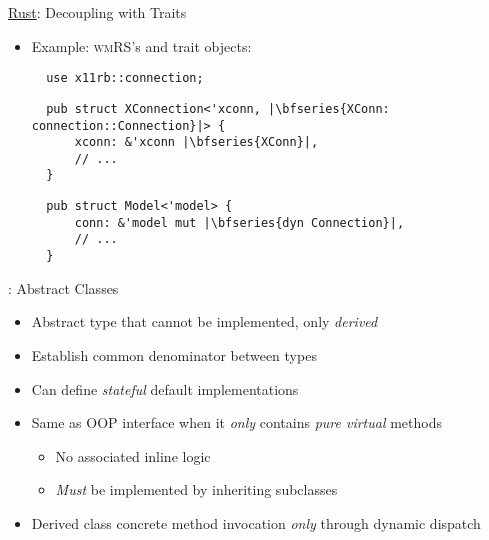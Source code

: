 \begin{frame}[fragile]{\underline{Rust}: Decoupling with Traits \hfill {\footnotesize \currentname}}


    \begin{itemize}

        \item Example: \textsc{wmRS}'s  and  trait objects:\\[3pt]
\begin{verbatim}
  use x11rb::connection;
\end{verbatim}
\begin{verbatim}
  pub struct XConnection<'xconn, |\bfseries{XConn: connection::Connection}|> {
      xconn: &'xconn |\bfseries{XConn}|,
      // ...
  }
\end{verbatim}

\begin{verbatim}
  pub struct Model<'model> {
      conn: &'model mut |\bfseries{dyn Connection}|,
      // ...
  }
\end{verbatim}

    \end{itemize}

    \vfill

\end{frame}

\begin{frame}[fragile]{\underline{\cpp}: Abstract Classes \hfill {\footnotesize \currentname}}


    \begin{itemize}

        \item Abstract type that cannot be implemented, only \textit{derived}

        \item Establish common denominator between types

        \item Can define \textit{stateful} default implementations

        \item Same as OOP interface when it \textit{only} contains \textit{pure virtual} methods
            \begin{itemize}
                \item No associated inline logic
                \item \textit{Must} be implemented by inheriting subclasses
            \end{itemize}

        \item Derived class concrete method invocation \textit{only} through dynamic dispatch

    \end{itemize}

    \vfill

\end{frame}

